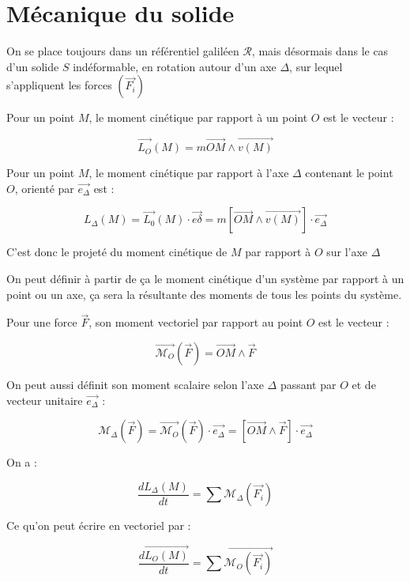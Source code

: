 \documentclass[a4paper,12pt]{book}
\newcommand{\Def}[2]{\begin{tcolorbox}[colback=white,colframe=red!10!green!20!blue!75!, title=Définition : #1]#2\end{tcolorbox}}
\newcommand{\Thr}[2]{\begin{tcolorbox}[sharp corners, colback=white,colframe=red!10!blue!30!green!75!, title=Théorème : #1]#2\end{tcolorbox}}
\begin{document}
\section{Mécanique du solide}
On se place toujours dans un référentiel galiléen $\mathcal{R}$, mais désormais dans le cas d'un solide $S$ indéformable, en rotation autour d'un axe $\Delta$, sur lequel s'appliquent les forces $(\vec{F_i})$
\Def{Moment cinétique}{Pour un point $M$, le moment cinétique par rapport à un point $O$ est le vecteur :
\par $$\overrightarrow{L_O}(M) = m\overrightarrow{OM}\wedge\overrightarrow{v(M)}$$
\par Pour un point $M$, le moment cinétique par rapport à l'axe $\Delta$ contenant le point $O$, orienté par $\overrightarrow{e_\Delta}$ est :
\par $$L_\Delta(M)=\overrightarrow{L_0}(M)\cdot\overrightarrow{e\delta} = m[\overrightarrow{OM}\wedge\overrightarrow{v(M)}]\cdot\overrightarrow{e_\Delta}$$
\par C'est donc le projeté du moment cinétique de $M$ par rapport à $O$ sur l'axe $\Delta$
\par On peut définir à partir de ça le moment cinétique d'un système par rapport à un point ou un axe, ça sera la résultante des moments de tous les points du système.}
\Def{Moment d'une force}{Pour une force $\vec{F}$, son moment vectoriel par rapport au point $O$ est le vecteur :
\par $$\overrightarrow{\mathcal{M}_O}(\vec{F}) = \overrightarrow{OM}\wedge \vec{F}$$
\par On peut aussi définit son moment scalaire selon l'axe $\Delta$ passant par $O$ et de vecteur unitaire $\overrightarrow{e_\Delta}$ :
\par $$\mathcal{M}_\Delta(\vec{F}) = \overrightarrow{\mathcal{M}_O}(\vec{F})\cdot\overrightarrow{e_\Delta} = [\vec{OM}\wedge\vec{F}]\cdot\vec{e_\Delta}$$}
\Thr{Théorème du moment cinétique}{On a :
\par $$\dfrac{dL_\Delta(M)}{dt} = \sum\mathcal{M}_\Delta(\vec{F_i})$$
\par Ce qu'on peut écrire en vectoriel par :
\par $$\dfrac{d\vec{L_O(M)}}{dt} = \sum\vec{\mathcal{M}_O(\vec{F_i})}$$}
\end{document}
